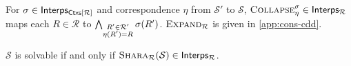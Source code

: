 For $\sigma \in \mathsf{Interps_{  \mathsf{Ctxs}[  \mathcal{R}  ]  }}$ and %
correspondence $\eta$ from $\mathcal{S}'$ to $\mathcal{S}$,
$\textsc{Collapse}_{\eta}^{\sigma} \in \mathsf{Interps_{  \mathcal{R}  }}$ maps each $R \in
\mathcal{R}$ to
%
$\bigwedge_{ \substack{R' \in \mathcal{R}' \\ \eta(R') = R} }
\sigma(R')$.
%
$\textsc{Expand}_{ \mathcal{R} }$ is given in \autoref{app:cons-cdd}.

\begin{thm}
  \label{thm:corr}
  $\mathcal{S}$ is solvable if and only if $\textsc{Shara}_{ \mathcal{R}
  }(\mathcal{S}) \in \mathsf{Interps_{  \mathcal{R}  }}$.
\end{thm}

